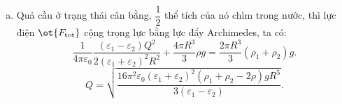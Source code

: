 \begin{loigiai}
\begin{enumerate}[1)]
\begin{enumerate}[a)]
    \item Quả cầu ở trạng thái cân bằng, $\dfrac{1}{2}$ thể tích của nó chìm trong nước, thì lực điện ${{\ot{F_{\text{tot}}}}}$ cộng trọng lực bằng lực đẩy Archimedes, ta có:
    $$\dfrac{1}{4\pi {{\varepsilon }_{0}}}\dfrac{\left( {{\varepsilon }_{1}}-{{\varepsilon }_{2}} \right){{Q}^{2}}}{2{{\left( {{\varepsilon }_{1}}+{{\varepsilon }_{2}} \right)}^{2}}{{R}^{2}}}+\dfrac{4\pi {{R}^{3}}}{3}\rho g=\dfrac{2\pi {{R}^{3}}}{3}\left( {{\rho }_{1}}+{{\rho }_{2}} \right)g.$$
    $$Q=\sqrt{\dfrac{16{{\pi }^{2}}{{\varepsilon }_{0}}{{\left( {{\varepsilon }_{1}}+{{\varepsilon }_{2}} \right)}^{2}}\left( {{\rho }_{1}}+{{\rho }_{2}}-2\rho  \right)g{{R}^{5}}}{3\left( {{\varepsilon }_{1}}-{{\varepsilon }_{2}} \right)}}.$$

        \end{enumerate}
    \end{enumerate}
    \end{loigiai}
    
